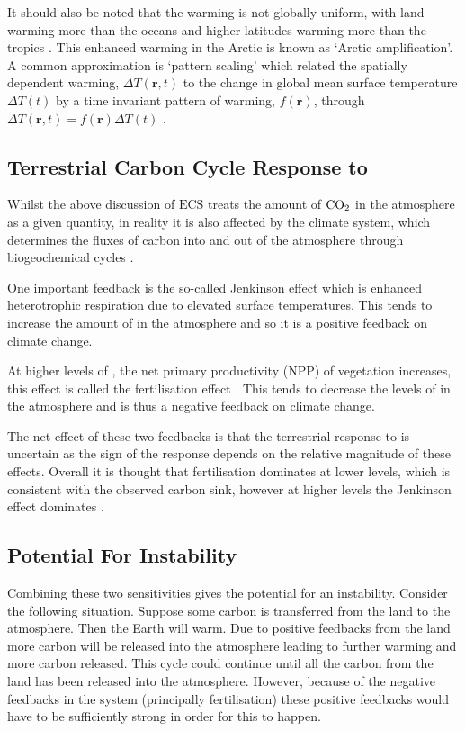 It should also be noted that the warming is not globally uniform, with land warming more than the oceans \parencite{Morice2021} and higher latitudes warming more than the tropics \parencite{Serreze2011}.
This enhanced warming in the Arctic is known as `Arctic amplification'. A common approximation is `pattern scaling' which related the spatially dependent warming, $\Delta T(\bm{r},t)$
to the change in global mean surface temperature $\Delta T(t)$ by a time invariant pattern of warming, $f(\bm{r})$,
through $\Delta T(\bm{r},t) = f(\bm{r}) \Delta T(t)$ \parencite{Huntingford2000a}.



\subsection{Terrestrial Carbon Cycle Response to }
Whilst the above discussion of $\mathrm{ECS}$ treats the amount of $\ce{CO2}$ in the atmosphere as a given quantity, in reality it is also affected by the climate
system, which determines the fluxes of carbon into and out of the atmosphere through biogeochemical cycles \parencite{Rothman2014}.

One important feedback is the so-called Jenkinson effect \parencite{Jenkinson1991} which is enhanced heterotrophic respiration due to elevated surface temperatures. This
tends to increase the amount of  in the atmosphere and so it is a positive feedback on climate change.

At higher levels of , the net primary productivity (NPP) of vegetation increases, this effect is called the  fertilisation effect \parencite{Wenzel2016}.
This tends to decrease the levels of  in the atmosphere and is thus a negative feedback on climate change.

The net effect of these two feedbacks is that the terrestrial response to  is uncertain as the sign of the response depends on the relative magnitude of these effects. Overall it
is thought that  fertilisation dominates at lower  levels, which is consistent with the observed carbon sink, however at higher  levels the Jenkinson effect
dominates \parencite{Cox2000,Friedlingstein2006,Arora2020}.

\subsection{Potential For Instability}
Combining these two sensitivities gives the potential for an instability. Consider the following situation. Suppose some carbon is transferred from the land to the atmosphere. Then the Earth
will warm. Due to positive feedbacks from the land more carbon will be released into the atmosphere leading to further warming and more carbon released. This cycle could continue until all the
carbon from the land has been released into the atmosphere. However, because of the negative feedbacks in the system (principally  fertilisation) these positive feedbacks would have to be
sufficiently strong in order for this to happen.

